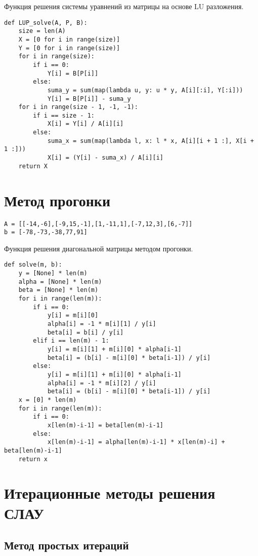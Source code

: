 \documentclass[pdf, unicode, 12pt, a4paper,oneside,fleqn]{article}
\begin{document}
Функция решения системы уравнений из матрицы на основе LU разложения.
\begin{lstlisting}
def LUP_solve(A, P, B):
    size = len(A)
    X = [0 for i in range(size)]
    Y = [0 for i in range(size)]
    for i in range(size):
        if i == 0:
            Y[i] = B[P[i]]
        else:
            suma_y = sum(map(lambda u, y: u * y, A[i][:i], Y[:i]))
            Y[i] = B[P[i]] - suma_y
    for i in range(size - 1, -1, -1):
        if i == size - 1:
            X[i] = Y[i] / A[i][i]
        else:
            suma_x = sum(map(lambda l, x: l * x, A[i][i + 1 :], X[i + 1 :]))
            X[i] = (Y[i] - suma_x) / A[i][i]
    return X
\end{lstlisting}

\section{Метод прогонки}

\begin{lstlisting}
A = [[-14,-6],[-9,15,-1],[1,-11,1],[-7,12,3],[6,-7]]
b = [-78,-73,-38,77,91]
\end{lstlisting}

Функция решения диагональной матрицы методом прогонки.
\begin{lstlisting}
def solve(m, b):
    y = [None] * len(m)
    alpha = [None] * len(m)
    beta = [None] * len(m)
    for i in range(len(m)):
        if i == 0:
            y[i] = m[i][0]
            alpha[i] = -1 * m[i][1] / y[i]
            beta[i] = b[i] / y[i]
        elif i == len(m) - 1:
            y[i] = m[i][1] + m[i][0] * alpha[i-1]
            beta[i] = (b[i] - m[i][0] * beta[i-1]) / y[i]
        else:
            y[i] = m[i][1] + m[i][0] * alpha[i-1]
            alpha[i] = -1 * m[i][2] / y[i]
            beta[i] = (b[i] - m[i][0] * beta[i-1]) / y[i]
    x = [0] * len(m)
    for i in range(len(m)):
        if i == 0:
            x[len(m)-i-1] = beta[len(m)-i-1]
        else:
            x[len(m)-i-1] = alpha[len(m)-i-1] * x[len(m)-i] + beta[len(m)-i-1]
    return x
\end{lstlisting}

\section{Итерационные методы решения СЛАУ}

\subsection{Метод простых итераций}
\end{document}
